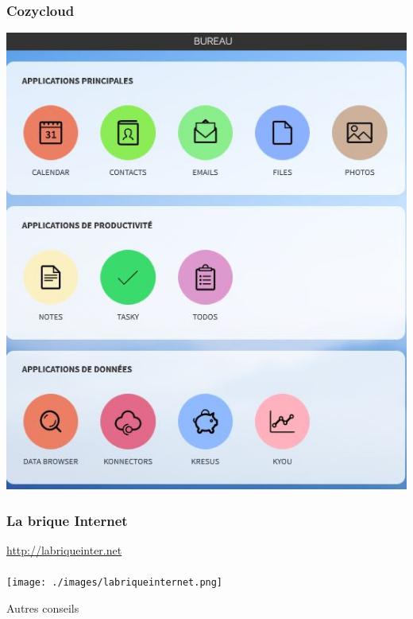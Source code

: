 \documentclass{beamer}
\begin{document}
\begin{frame}
\begin{center}
\frametitle{Cozycloud}
\includegraphics[scale=0.6] {./images/Cozycloud.jpg}
\end{center}
\end{frame}
\begin{frame}
\begin{center}
\frametitle{La brique Internet}
\url{http://labriqueinter.net}
\\~\\
\texttt{[image: ./images/labriqueinternet.png]}
\end{center}
\end{frame}

\begin{frame}
\begin{center}
\Huge{Autres conseils }
\end{center}
\end{frame}
\end{document}
